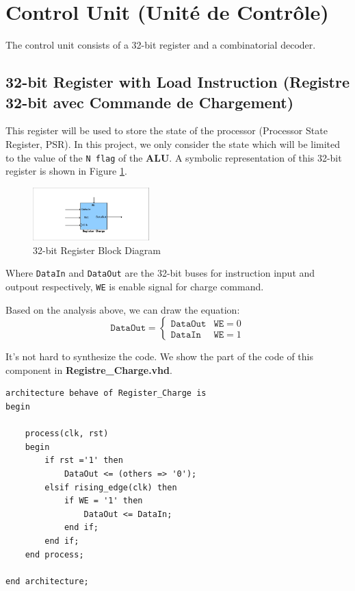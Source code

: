 \section{Control Unit (Unité de Contrôle)}

The control unit consists of a 32-bit register and a combinatorial decoder.

\subsection{32-bit Register with Load Instruction (Registre 32-bit avec Commande de Chargement)}

This register will be used to store the state of the processor 
(Processor State Register, PSR).
In this project, we only consider the state which will be 
limited to the value of the \texttt{N flag} of the \textbf{ALU}.
A symbolic representation of this 32-bit register
is shown in Figure \ref{fig:32Register}.

\begin{figure}[htp]
    \centering
    \includegraphics[width=0.4\textwidth]{picture/32Register.pdf}
    \caption{32-bit Register Block Diagram}     
    \label{fig:32Register}
\end{figure}

Where \texttt{DataIn} and \texttt{DataOut} are the 32-bit buses for 
instruction input and outpout respectively, \texttt{WE} is enable signal
for charge command.

Based on the analysis above, we can draw the equation:
\begin{equation*}
    \texttt{DataOut} = \begin{cases}
        \texttt{DataOut} & \texttt{WE} = 0 \\
        \texttt{DataIn} & \texttt{WE} = 1
    \end{cases}
\end{equation*} 

It's not hard to synthesize the code. We show the part of the code of this component in \textbf{Registre\_Charge.vhd}.

\begin{lstlisting}[style=vhdl]
architecture behave of Register_Charge is
begin
    
    process(clk, rst) 
    begin 
        if rst ='1' then 
            DataOut <= (others => '0'); 
        elsif rising_edge(clk) then 
            if WE = '1' then 
                DataOut <= DataIn;	
            end if; 
        end if; 
    end process; 
    
end architecture;
\end{lstlisting}


